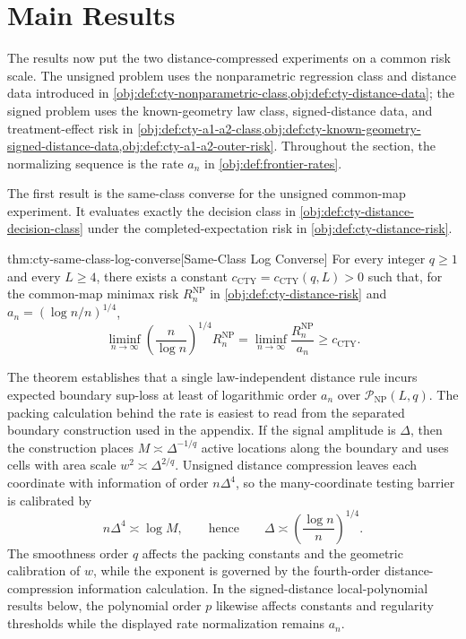 \section{Main Results}
\label{sec:main-results}

The results now put the two distance-compressed experiments on a common risk scale. The unsigned problem uses the nonparametric regression class and distance data introduced in \cref{obj:def:cty-nonparametric-class,obj:def:cty-distance-data}; the signed problem uses the known-geometry law class, signed-distance data, and treatment-effect risk in \cref{obj:def:cty-a1-a2-class,obj:def:cty-known-geometry-signed-distance-data,obj:def:cty-a1-a2-outer-risk}. Throughout the section, the normalizing sequence is the rate \(a_n\) in \cref{obj:def:frontier-rates}.

The first result is the same-class converse for the unsigned common-map experiment. It evaluates exactly the decision class in \cref{obj:def:cty-distance-decision-class} under the completed-expectation risk in \cref{obj:def:cty-distance-risk}.

\begin{theoremv}{thm:cty-same-class-log-converse}[Same-Class Log Converse]
For every integer \(q\geq 1\) and every \(L\geq 4\), there exists a constant \(c_{\mathrm{CTY}}=c_{\mathrm{CTY}}(q,L)>0\) such that, for the common-map minimax risk \(R_n^{\mathrm{NP}}\) in \cref{obj:def:cty-distance-risk} and \(a_n=(\log n/n)^{1/4}\),
\[
\liminf_{n\to\infty}
\left(\frac{n}{\log n}\right)^{1/4} R_n^{\mathrm{NP}}
=
\liminf_{n\to\infty}\frac{R_n^{\mathrm{NP}}}{a_n}
\geq c_{\mathrm{CTY}} .
\]
\end{theoremv}

The theorem establishes that a single law-independent distance rule incurs expected boundary sup-loss at least of logarithmic order \(a_n\) over \(\mathcal P_{\mathrm{NP}}(L,q)\). The packing calculation behind the rate is easiest to read from the separated boundary construction used in the appendix. If the signal amplitude is \(\Delta\), then the construction places \(M\asymp\Delta^{-1/q}\) active locations along the boundary and uses cells with area scale \(w^2\asymp\Delta^{2/q}\). Unsigned distance compression leaves each coordinate with information of order \(n\Delta^4\), so the many-coordinate testing barrier is calibrated by
\[
n\Delta^4\asymp \log M,
\qquad\text{hence}\qquad
\Delta\asymp \left(\frac{\log n}{n}\right)^{1/4}.
\]
The smoothness order \(q\) affects the packing constants and the geometric calibration of \(w\), while the exponent is governed by the fourth-order distance-compression information calculation. In the signed-distance local-polynomial results below, the polynomial order \(p\) likewise affects constants and regularity thresholds while the displayed rate normalization remains \(a_n\).

